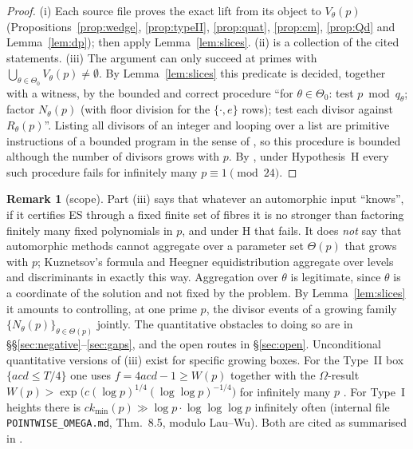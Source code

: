 \documentclass[10pt,reqno]{amsart}
\theoremstyle{definition}
\newtheorem{remark}[theorem]{Remark}
\numberwithin{equation}{section}
\begin{document}
\begin{proof}
(i) Each source file proves the exact lift from its object to $V_\theta(p)$
(Propositions~\ref{prop:wedge}, \ref{prop:typeII}, \ref{prop:quat},
\ref{prop:cm}, \ref{prop:Qd} and Lemma~\ref{lem:dp}); then apply
Lemma~\ref{lem:slices}. (ii) is a collection of the cited statements.
(iii) The argument can only succeed at primes with
$\bigcup_{\theta\in\Theta_0}V_\theta(p)\ne\emptyset$. By Lemma~\ref{lem:slices}
this predicate is decided, together with a witness, by the bounded and
correct procedure ``for $\theta\in\Theta_0$: test $p\bmod q_\theta$; factor
$N_\theta(p)$ (with floor division for the $\{\cdot,e\}$ rows); test each
divisor against $R_\theta(p)$''. Listing all divisors of an integer and
looping over a list are primitive instructions of a bounded program in the
sense of \cite[\S1.2]{PS}, so this procedure is bounded although the number
of divisors grows with $p$. By \cite[Thm.~C]{PS}, under Hypothesis~H
every such procedure fails for infinitely many $p\equiv1\pmod{24}$.
\end{proof}

\begin{remark}[scope]\label{rem:scope}
Part (iii) says that whatever an automorphic input ``knows'', if it
certifies ES through a fixed finite set of fibres it is no stronger than
factoring finitely many fixed polynomials in $p$, and under H that fails.
It does \emph{not} say that automorphic methods cannot aggregate over a
parameter set $\Theta(p)$ that grows with $p$; Kuznetsov's formula and
Heegner equidistribution aggregate over levels and discriminants in
exactly this way. Aggregation over $\theta$ is legitimate, since $\theta$
is a coordinate of the solution and not fixed by the problem. By
Lemma~\ref{lem:slices} it amounts to controlling, at one prime $p$, the
divisor events of a growing family $\{N_\theta(p)\}_{\theta\in\Theta(p)}$
jointly. The quantitative obstacles to doing so are in
\S\S\ref{sec:negative}--\ref{sec:gaps}, and the open routes in
\S\ref{sec:open}. Unconditional quantitative versions of (iii) exist for
specific growing boxes. For the Type~II box $\{acd\le T/4\}$ one uses
$f=4acd-1\ge W(p)$ together with the $\Omega$-result
$W(p)>\exp\bigl(c(\log p)^{1/4}(\log\log p)^{-1/4}\bigr)$ for infinitely
many $p$ \cite{SE}. For Type~I
heights there is $ck_{\min}(p)\gg\log p\cdot\log\log\log p$ infinitely
often (internal file \texttt{POINTWISE\_OMEGA.md}, Thm.~8.5, modulo
Lau--Wu). Both are cited as summarised in \cite[\S2.2]{RT2}.
\end{remark}
\end{document}
